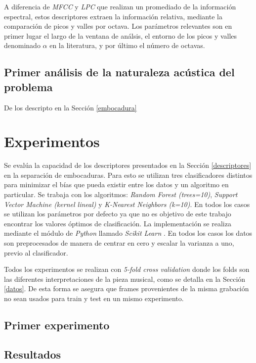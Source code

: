 \documentclass{article}
\begin{document}
A diferencia de \textit{MFCC} y \textit{LPC} que realizan un promediado de la información espectral, estos descriptores extraen la información relativa, mediante la comparación de picos y valles por octava. Los parámetros relevantes son en primer lugar el largo de la ventana de análsis, el entorno de los picos y valles denominado $\alpha$ en la literatura, y por último el número de octavas. 

\subsection{Primer análisis de la naturaleza acústica del problema}

De los descripto en la Sección \ref{embocadura}
   
\section{Experimentos}

Se evalúa la capacidad de los descriptores presentados en la Sección \ref{descriptores} en la separación de embocaduras. Para esto se utilizan tres clasificadores distintos para minimizar el bías que pueda existir entre los datos y un algoritmo en particular. Se trabaja con los algoritmos: \textit{Random Forest (trees=10)}, \textit{Support Vector Machine (kernel lineal)} y \textit{K-Nearest Neighbors (k=10)}. En todos los casos se utilizan los parámetros por defecto ya que no es objetivo de este trabajo encontrar los valores óptimos de clasificación. La implementación se realiza mediante el módulo de \textit{Python} llamado \textit{Scikit Learn} \citep{pedregosa2011scikit}. En todos los casos los datos son preprocesados de manera de centrar en cero y escalar la varianza a uno, previo al clasificador.
\medskip

Todos los experimentos se realizan con \textit{5-fold cross validation} donde los folds son las diferentes interpretaciones de la pieza musical, como se detalla en la Sección \ref{datos}. De esta forma se asegura que frames provenientes de la misma grabación no sean usados para train y test en un mismo experimento.
\medskip

\subsection{Primer experimento}

\subsection{Resultados}
\end{document}
